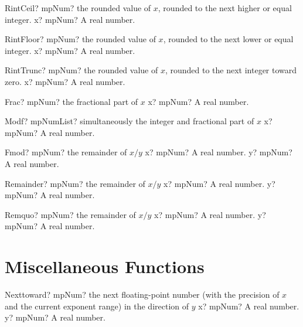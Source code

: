 \documentclass[12pt,a4paper,openany]{book}
\begin{document}
\begin{mpFunctionsExtract}
\mpFunctionOne
{RintCeil? mpNum? the rounded value of $x$, rounded to the next higher or equal integer.}
{x? mpNum? A real number.}
\end{mpFunctionsExtract}

\begin{mpFunctionsExtract}
\mpFunctionOne
{RintFloor? mpNum? the rounded value of $x$, rounded to the next lower or equal integer.}
{x? mpNum? A real number.}
\end{mpFunctionsExtract}

\begin{mpFunctionsExtract}
\mpFunctionOne
{RintTrunc? mpNum? the rounded value of $x$, rounded to the next integer toward zero.}
{x? mpNum? A real number.}
\end{mpFunctionsExtract}

\begin{mpFunctionsExtract}
\mpFunctionOne
{Frac? mpNum? the fractional part of $x$}
{x? mpNum? A real number.}
\end{mpFunctionsExtract}

\begin{mpFunctionsExtract}
\mpFunctionOne
{Modf? mpNumList? simultaneously the integer and fractional part of $x$}
{x? mpNum? A real number.}
\end{mpFunctionsExtract}

\begin{mpFunctionsExtract}
\mpFunctionTwo
{Fmod? mpNum? the remainder of $x/y$}
{x? mpNum? A real number.}
{y? mpNum? A real number.}
\end{mpFunctionsExtract}

\begin{mpFunctionsExtract}
\mpFunctionTwo
{Remainder? mpNum? the remainder of $x/y$}
{x? mpNum? A real number.}
{y? mpNum? A real number.}
\end{mpFunctionsExtract}

\begin{mpFunctionsExtract}
\mpFunctionTwo
{Remquo? mpNum? the remainder of $x/y$}
{x? mpNum? A real number.}
{y? mpNum? A real number.}
\end{mpFunctionsExtract}

\section{Miscellaneous Functions}

\begin{mpFunctionsExtract}
\mpFunctionTwo
{Nexttoward? mpNum? the next floating-point number (with the precision of $x$ and the current exponent range) in the direction of $y$}
{x? mpNum? A real number.}
{y? mpNum? A real number.}
\end{mpFunctionsExtract}
\end{document}
